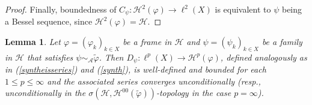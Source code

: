 \documentclass{amsart}
\newtheorem{lem.}[theorem]{Lemma}
\def\Hil{\mathcal{H}}
\newcommand{\A}[0]{{\mathcal{A}}}
\renewcommand{\H}{{\mathcal{H}}}
\begin{document}
\begin{proof}
Finally, boundedness of $C_{\psi}:\Hil^2(\varphi) \to \ell^2(X)$ is equivalent to $\psi$ being a Bessel sequence, since $\Hil^2(\varphi) = \Hil$.
\end{proof}

\begin{lem.}\label{Dbounded}
Let $\varphi = (\varphi_k)_{k\in X}$ be a frame in $\Hil$ and $\psi = (\psi_k)_{k\in X}$ be a family in $\H$ that satisfies $\psi\sim_\A \widetilde{\varphi}$. %
Then $D_\psi:\ell^p(X) \to \H^p(\varphi)$, defined analogously as in (\ref{syntheisseries}) and (\ref{synth}), is well-defined and bounded for each $1\leq p\leq \infty$ and the associated series converges unconditionally (resp., unconditionally in the $\sigma(\Hil,\Hil^{00}(\widetilde\varphi))$-topology in the case $p=\infty$).
\end{lem.}
\end{document}
